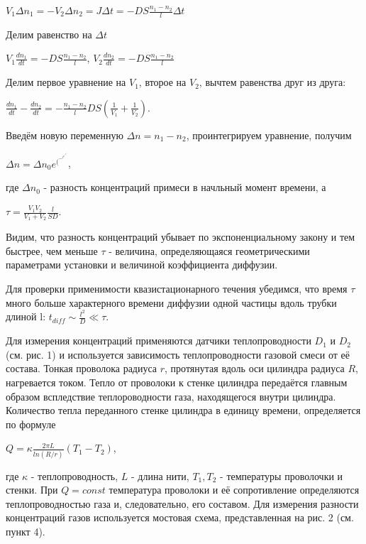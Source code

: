 \documentclass[a4paper,12pt]{article} %
\begin{document}
\begin{center}
$\displaystyle V_1 \Delta n_1 = - V_2 \Delta n_2 = J \Delta t = -DS \frac{n_1-n_2}{l} \Delta t$
\end{center}
Делим равенство на $\Delta t$
\begin{center}
$\displaystyle V_1 \frac{dn_1}{dt} = -DS\frac{n_1-n_2}{l}$, $V_2 \frac{dn_2}{dt} = -DS\frac{n_1-n_2}{l}$
\end{center}
Делим первое уравнение на $V_1$, второе на $V_2$, вычтем равенства друг из друга:
\begin{center}
$\displaystyle \frac{dn_1}{dt}- \frac{dn_2}{dt} = - \frac{n_1-n_2}{l}DS(\frac{1}{V_1} +\frac{1}{V_2} )$.
\end{center}
Введём новую переменную $\Delta n = n_1-n_2$, проинтегрируем уравнение, получим
\begin{center}
$\Delta n = \Delta n_0 e^(^-^t^/^\tau^)$,
\end{center}
где $\Delta n_0$ - разность концентраций примеси в начльный момент времени, а
\begin{center}
$\displaystyle \tau = \frac{V_1 V_2}{V_1 + V_2} \frac {l}{SD}$.
\end{center}
Видим, что разность концентраций убывает по экспоненциальному закону и тем быстрее, чем меньше $\tau$ - величина, определяющаяся геометрическими параметрами установки и величиной коэффициента диффузии.
\item Для проверки применимости квазистационарного течения убедимся, что время $\tau$ много больше характерного времени диффузии одной частицы вдоль трубки длиной l: $\displaystyle t_{diff} \sim \frac{l^2}{D} \ll \tau$.

\item Для измерения концентраций применяются датчики теплопроводности $D_1$ и $D_2$ (см. рис. 1) и используется зависимость теплопроводности газовой смеси от её состава. Тонкая проволока радиуса $r$, протянутая вдоль оси цилиндра радиуса $R$, нагревается током. Тепло от проволоки к стенке цилиндра передаётся главным образом вспледствие теплороводности газа, находящегося внутри цилиндра. Количество тепла переданного стенке цилиндра в единицу времени, определяется по формуле 
\begin{center}
$\displaystyle Q = \kappa \frac{2\pi L}{ln (R/r)}(T_1-T_2)$,
\end{center}
где $\kappa$ - теплопроводность, $L$ - длина нити, $T_1, T_2$ - температуры проволочки и стенки. При $Q = const$ температура проволоки и её сопротивление определяются теплопроводностью газа и, следовательно, его составом. Для измерения разности концентраций газов используется  
мостовая схема, представленная на рис. 2 (см. пункт 4).
\end{document}
